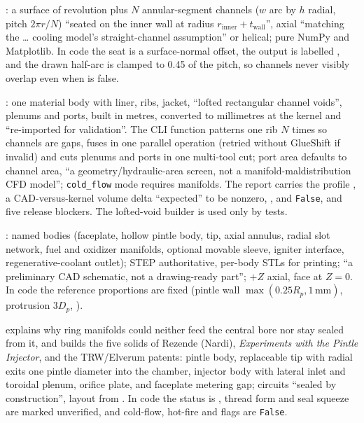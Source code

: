 \textbf{}: a surface of revolution plus $N$ annular-segment channels ($w$ arc by $h$ radial, pitch $2\pi r/N$) ``seated on the inner wall at radius $r_\mathrm{inner}+t_\mathrm{wall}$'', axial ``matching the \ldots{} cooling model's straight-channel assumption'' or helical; pure NumPy and Matplotlib. In code the seat is a surface-normal offset, the output is labelled , and the drawn half-arc is clamped to 0.45 of the pitch, so channels never visibly overlap even when  is false.

\textbf{}: one material body with liner, ribs, jacket, ``lofted rectangular channel voids'', plenums and ports, built in metres, converted to millimetres at the kernel and ``re-imported for validation''. The CLI function patterns one rib $N$ times so channels are gaps, fuses in one parallel operation (retried without GlueShift if invalid) and cuts plenums and ports in one multi-tool cut; port area defaults to channel area, ``a geometry/hydraulic-area screen, not a manifold-maldistribution CFD model''; \texttt{cold\_flow} mode requires manifolds. The report carries the profile , a CAD-versus-kernel volume delta ``expected'' to be nonzero, ,  and  \texttt{False}, and five release blockers. The lofted-void builder  is used only by tests.

\textbf{}: named bodies (faceplate, hollow pintle body, tip, axial annulus, radial slot network, fuel and oxidizer manifolds, optional movable sleeve, igniter interface, regenerative-coolant outlet); STEP authoritative, per-body STLs for printing; ``a preliminary CAD schematic, not a drawing-ready part''; $+Z$ axial, face at $Z=0$. In code the reference proportions are fixed (pintle wall $\max(0.25R_p, 1\,\mathrm{mm})$, protrusion $3D_p$, ).

\textbf{} explains why ring manifolds could neither feed the central bore nor stay sealed from it, and builds the five solids of Rezende (Nardi), \emph{Experiments with the Pintle Injector}, and the TRW/Elverum patents: pintle body, replaceable tip with radial exits one pintle diameter into the chamber, injector body with lateral inlet and toroidal plenum, orifice plate, and faceplate metering gap; circuits ``sealed by construction'', layout from . In code the status is , thread form and seal squeeze are marked unverified, and cold-flow, hot-fire and  flags are \texttt{False}.

